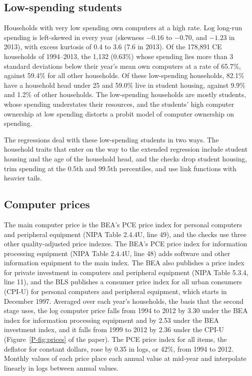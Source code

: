 \documentclass[11pt]{article}
\begin{document}
\subsection{Low-spending students}
\label{app:students}

Households with very low spending own computers at a high rate. Log long-run spending is left-skewed in every year (skewness $-0.16$ to $-0.70$, and $-1.23$ in 2013), with excess kurtosis of 0.4 to 3.6 (7.6 in 2013). Of the 178{,}891 CE households of 1994--2013, the 1{,}132 (0.63\%) whose spending lies more than 3 standard deviations below their year's mean own computers at a rate of 65.7\%, against 59.4\% for all other households. Of these low-spending households, 82.1\% have a household head under 25 and 59.0\% live in student housing, against 9.9\% and 1.2\% of other households. The low-spending households are mostly students, whose spending understates their resources, and the students' high computer ownership at low spending distorts a probit model of computer ownership on spending.

The regressions deal with these low-spending students in two ways. The household traits that enter on the way to the extended regression include student housing and the age of the household head, and the checks drop student housing, trim spending at the 0.5th and 99.5th percentiles, and use link functions with heavier tails.

\subsection{Computer prices}
\label{app:pricedata}

The main computer price is the BEA's PCE price index for personal computers and peripheral equipment (NIPA Table 2.4.4U, line 49), and the checks use three other quality-adjusted price indexes. The BEA's PCE price index for information processing equipment (NIPA Table 2.4.4U, line 48) adds software and other information equipment to the main index. The BEA also publishes a price index for private investment in computers and peripheral equipment (NIPA Table 5.3.4, line 11), and the BLS publishes a consumer price index for all urban consumers (CPI-U) for personal computers and peripheral equipment, which starts in December 1997. Averaged over each year's households, the basis that the second stage uses, the log computer price falls from 1994 to 2012 by 3.30 under the BEA index for information processing equipment and by 2.53 under the BEA investment index, and it falls from 1999 to 2012 by 2.36 under the CPI-U (Figure~\ref{P-fig:prices} of the paper). The PCE price index for all items, the deflator for constant dollars, rose by 0.35 in logs, or 42\%, from 1994 to 2012. Monthly values of each price place each annual value at mid-year and interpolate linearly in logs between annual values.
\end{document}
